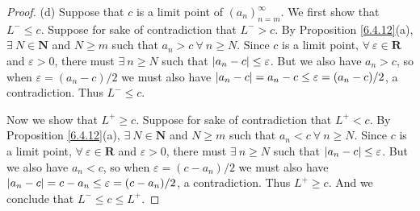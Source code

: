 \begin{proof}{(d)}
Suppose that \(c\) is a limit point of \((a_n)_{n = m}^\infty\).
We first show that \(L^- \leq c\).
Suppose for sake of contradiction that \(L^- > c\).
By Proposition \ref{6.4.12}(a), \(\exists\ N \in \mathbf{N}\) and \(N \geq m\) such that \(a_n > c \ \forall\ n \geq N\).
Since \(c\) is a limit point, \(\forall\ \varepsilon \in \mathbf{R}\) and \(\varepsilon > 0\), there must \(\exists\ n \geq N\) such that \(\abs*{a_n - c} \leq \varepsilon\).
But we also have \(a_n > c\), so when \(\varepsilon = (a_n - c) / 2\) we must also have \(\abs*{a_n - c} = a_n - c \leq \varepsilon = (a_n - c) / 2\), a contradiction.
Thus \(L^- \leq c\).

Now we show that \(L^+ \geq c\).
Suppose for sake of contradiction that \(L^+ < c\).
By Proposition \ref{6.4.12}(a), \(\exists\ N \in \mathbf{N}\) and \(N \geq m\) such that \(a_n < c \ \forall\ n \geq N\).
Since \(c\) is a limit point, \(\forall\ \varepsilon \in \mathbf{R}\) and \(\varepsilon > 0\), there must \(\exists\ n \geq N\) such that \(\abs*{a_n - c} \leq \varepsilon\).
But we also have \(a_n < c\), so when \(\varepsilon = (c - a_n) / 2\) we must also have \(\abs*{a_n - c} = c - a_n \leq \varepsilon = (c - a_n) / 2\), a contradiction.
Thus \(L^+ \geq c\).
And we conclude that \(L^- \leq c \leq L^+\).
\end{proof}

